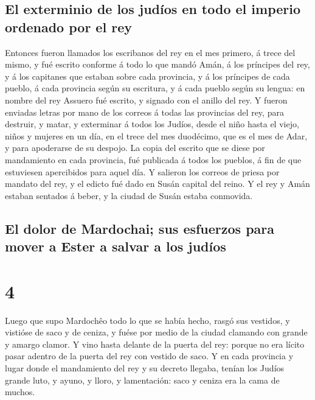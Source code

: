 \hypertarget{el-exterminio-de-los-juduxedos-en-todo-el-imperio-ordenado-por-el-rey}{%
\subsection{El exterminio de los judíos en todo el imperio ordenado por
el
rey}\label{el-exterminio-de-los-juduxedos-en-todo-el-imperio-ordenado-por-el-rey}}

 Entonces fueron llamados los escribanos del rey en el
mes primero, á trece del mismo, y fué escrito conforme á todo lo que
mandó Amán, á los príncipes del rey, y á los capitanes que estaban sobre
cada provincia, y á los príncipes de cada pueblo, á cada provincia según
su escritura, y á cada pueblo según su lengua: en nombre del rey Assuero
fué escrito, y signado con el anillo del rey.  Y fueron
enviadas letras por mano de los correos á todas las provincias del rey,
para destruir, y matar, y exterminar á todos los Judíos, desde el niño
hasta el viejo, niños y mujeres en un día, en el trece del mes
duodécimo, que es el mes de Adar, y para apoderarse de su despojo.
 La copia del escrito que se diese por mandamiento en
cada provincia, fué publicada á todos los pueblos, á fin de que
estuviesen apercibidos para aquel día.  Y salieron los
correos de priesa por mandato del rey, y el edicto fué dado en Susán
capital del reino. Y el rey y Amán estaban sentados á beber, y la ciudad
de Susán estaba conmovida.

\hypertarget{el-dolor-de-mardochai-sus-esfuerzos-para-mover-a-ester-a-salvar-a-los-juduxedos}{%
\subsection{El dolor de Mardochai; sus esfuerzos para mover a Ester a
salvar a los
judíos}\label{el-dolor-de-mardochai-sus-esfuerzos-para-mover-a-ester-a-salvar-a-los-juduxedos}}

\hypertarget{section-3}{%
\section{4}\label{section-3}}

 Luego que supo Mardochêo todo lo que se había hecho,
rasgó sus vestidos, y vistióse de saco y de ceniza, y fuése por medio de
la ciudad clamando con grande y amargo clamor.  Y vino
hasta delante de la puerta del rey: porque no era lícito pasar adentro
de la puerta del rey con vestido de saco.  Y en cada
provincia y lugar donde el mandamiento del rey y su decreto llegaba,
tenían los Judíos grande luto, y ayuno, y lloro, y lamentación: saco y
ceniza era la cama de muchos.


